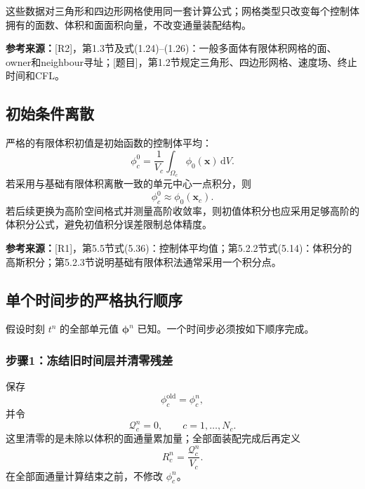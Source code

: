 \documentclass[UTF8,12pt,a4paper]{ctexart}
\numberwithin{equation}{section}
\newcommand{\Rone}{\textnormal{[R1]}}
\newcommand{\Rtwo}{\textnormal{[R2]}}
\newcommand{\Task}{\textnormal{[题目]}}
\newcommand{\source}[1]{%
  \par\smallskip
  \noindent\colorbox{sourcebg}{%
    \parbox{0.955\linewidth}{\footnotesize\color{sourcegray}\textbf{参考来源：}#1}%
  }
  \par\smallskip
}
\newcommand{\dd}{\,\mathrm d}
\newcommand{\phiv}{\bm\phi}
\begin{document}
这些数据对三角形和四边形网格使用同一套计算公式；网格类型只改变每个控制体拥有的面数、体积和面面积向量，不改变通量装配结构。

\source{\Rtwo，第1.3节及式(1.24)--(1.26)：一般多面体有限体积网格的面、owner和neighbour寻址；\Task，第1.2节规定三角形、四边形网格、速度场、终止时间和CFL。}

\subsection{初始条件离散}

严格的有限体积初值是初始函数的控制体平均：
\begin{equation}
  \boxed{
  \phi_c^0
  =\frac{1}{V_c}\int_{\Omega_c}\phi_0(\bm x)\dd V
  }.
  \label{eq:initial_average}
\end{equation}
若采用与基础有限体积离散一致的单元中心一点积分，则
\begin{equation}
  \phi_c^0\approx\phi_0(\bm x_c).
  \label{eq:initial_midpoint}
\end{equation}
若后续更换为高阶空间格式并测量高阶收敛率，则初值体积分也应采用足够高阶的体积分公式，避免初值积分误差限制总体精度。

\source{\Rone，第5.5节式(5.36)：控制体平均值；第5.2.2节式(5.14)：体积分的高斯积分；第5.2.3节说明基础有限体积法通常采用一个积分点。}

\subsection{单个时间步的严格执行顺序}

假设时刻 $t^n$ 的全部单元值 $\phiv^n$ 已知。一个时间步必须按如下顺序完成。

\subsubsection*{步骤1：冻结旧时间层并清零残差}

保存
\begin{equation}
  \phi_c^{\mathrm{old}}=\phi_c^n,
  \label{eq:freeze_old}
\end{equation}
并令
\begin{equation}
  \mathcal Q_c^n=0,
  \qquad c=1,\ldots,N_c.
  \label{eq:zero_residual}
\end{equation}
这里清零的是未除以体积的面通量累加量；全部面装配完成后再定义
\begin{equation}
  R_c^n=\frac{\mathcal Q_c^n}{V_c}.
  \label{eq:solver_residual_normalization}
\end{equation}
在全部面通量计算结束之前，不修改 $\phi_c^n$。
\end{document}
